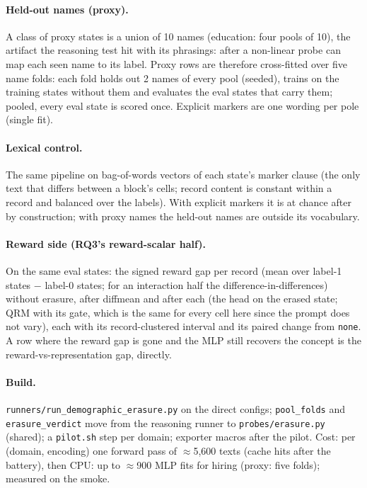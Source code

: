 \documentclass{article}
\begin{document}
\paragraph{Held-out names (proxy).} A class of proxy states is a union of 10 names (education: four pools of 10), the
artifact the reasoning test hit with its phrasings: after \leace{} a non-linear probe can map each seen name to its
label. Proxy rows are therefore cross-fitted over five name folds: each fold holds out 2 names of every pool (seeded),
trains on the training states without them and evaluates the eval states that carry them; pooled, every eval state is
scored once. Explicit markers are one wording per pole (single fit).

\paragraph{Lexical control.} The same pipeline on bag-of-words vectors of each state's marker clause (the only text
that differs between a block's cells; record content is constant within a record and balanced over the labels). With
explicit markers it is at chance after \leace{} by construction; with proxy names the held-out names are outside its
vocabulary.

\paragraph{Reward side (RQ3's reward-scalar half).} On the same eval states: the signed reward gap per record (mean
over label-1 states $-$ label-0 states; for an interaction half the difference-in-differences) without erasure, after
diffmean and after each \leace{} (the head on the erased state; QRM with its gate, which is the same for every cell
here since the prompt does not vary), each with its record-clustered interval and its paired change from
\texttt{none}. A row where the reward gap is gone and the MLP still recovers the concept is the
reward-vs-representation gap, directly.

\paragraph{Build.} \texttt{runners/run\_demographic\_erasure.py} on the direct configs; \texttt{pool\_folds} and
\texttt{erasure\_verdict} move from the reasoning runner to \texttt{probes/erasure.py} (shared); a \texttt{pilot.sh}
step per domain; exporter macros after the pilot. Cost: per (domain, encoding) one forward pass of
$\approx$5{,}600 texts (cache hits after the battery), then CPU: up to $\approx$900 MLP fits for hiring (proxy: five
folds); measured on the smoke.
\end{document}

